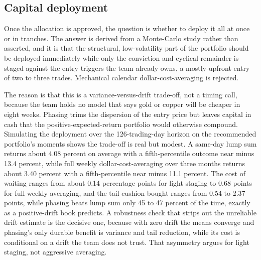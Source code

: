 \documentclass[11pt,a4paper]{article}
\begin{document}
\subsection{Capital deployment}

Once the allocation is approved, the question is whether to deploy it all at once or in tranches. The answer is derived from a Monte-Carlo study rather than asserted, and it is that the structural, low-volatility part of the portfolio should be deployed immediately while only the conviction and cyclical remainder is staged against the entry triggers the team already owns, a mostly-upfront entry of two to three trades. Mechanical calendar dollar-cost-averaging is rejected.

The reason is that this is a variance-versus-drift trade-off, not a timing call, because the team holds no model that says gold or copper will be cheaper in eight weeks. Phasing trims the dispersion of the entry price but leaves capital in cash that the positive-expected-return portfolio would otherwise compound. Simulating the deployment over the 126-trading-day horizon on the recommended portfolio's moments shows the trade-off is real but modest. A same-day lump sum returns about 4.08 percent on average with a fifth-percentile outcome near minus 13.4 percent, while full weekly dollar-cost-averaging over three months returns about 3.40 percent with a fifth-percentile near minus 11.1 percent. The cost of waiting ranges from about 0.14 percentage points for light staging to 0.68 points for full weekly averaging, and the tail cushion bought ranges from 0.54 to 2.37 points, while phasing beats lump sum only 45 to 47 percent of the time, exactly as a positive-drift book predicts. A robustness check that strips out the unreliable drift estimate is the decisive one, because with zero drift the means converge and phasing's only durable benefit is variance and tail reduction, while its cost is conditional on a drift the team does not trust. That asymmetry argues for light staging, not aggressive averaging.
\end{document}

